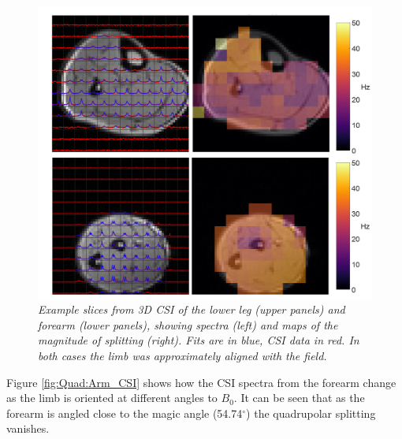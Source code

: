 \begin{figure}
    \centering
    \includegraphics[width=1\textwidth]{Figures/Quad/Calf_Arm_CSI.png}
    \caption{\textit{Example slices from 3D \ac{CSI} of the lower leg (upper panels) and forearm (lower panels), showing spectra (left) and maps of the magnitude of splitting (right). Fits are in blue, CSI data in red. In both cases the limb was approximately aligned with the field.}}
    \label{fig:Quad:Calf_Arm_CSI}
\end{figure}

Figure \ref{fig:Quad:Arm_CSI} shows how the \ac{CSI} spectra from the forearm change as the limb is oriented at different angles to $B_0$. It can be seen that as the forearm is angled close to the magic angle (54.74$^\circ$) the quadrupolar splitting vanishes. 

